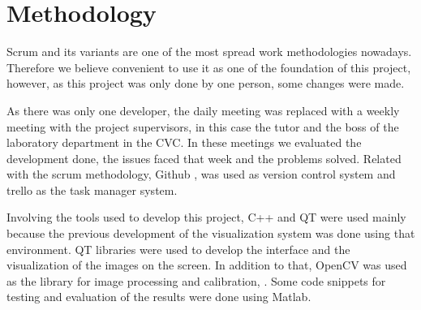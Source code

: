 \documentclass[10pt,a4paper,twocolumn,twoside]{article}
\begin{document}
	\section{Methodology}
	
	Scrum and its variants are one of the most spread work methodologies nowadays. Therefore we believe convenient to use it as one of the foundation of this project, however, as this project was only done by one person, some changes were made. 
	
	As there was only one developer, the daily meeting was replaced with a weekly meeting with the project supervisors, in this case the tutor and the boss of the laboratory department in the CVC. In these meetings we evaluated the development done, the issues faced that week and the problems solved. Related with the scrum methodology, Github \cite{web:github},\cite{web:githubDesktop} was used as version control system and trello\cite{web:trello} as the task manager system.
	
	Involving the tools used to develop this project, C++ and QT \cite{web:qt} were used mainly because the previous development of the visualization system was done using that environment. QT libraries were used to develop the interface and the visualization of the images on the screen. In addition to that, OpenCV was used as the library for image processing and calibration, \cite{web:opencv}. Some code snippets for testing and evaluation of the results were done using Matlab\cite{web:matlab}. 
	
	
	
	
	
	
	
\end{document}
